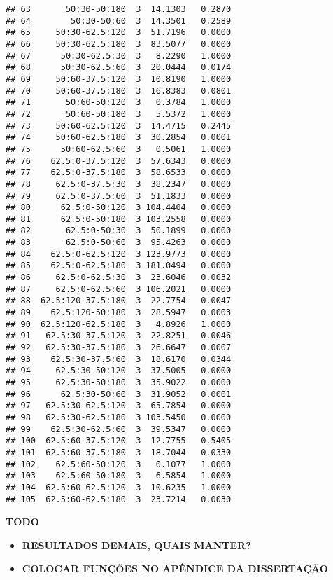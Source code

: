 \begin{knitrout}
\begin{kframe}
\begin{verbatim}
## 63       50:30-50:180  3  14.1303   0.2870
## 64        50:30-50:60  3  14.3501   0.2589
## 65     50:30-62.5:120  3  51.7196   0.0000
## 66     50:30-62.5:180  3  83.5077   0.0000
## 67      50:30-62.5:30  3   8.2290   1.0000
## 68      50:30-62.5:60  3  20.0444   0.0174
## 69     50:60-37.5:120  3  10.8190   1.0000
## 70     50:60-37.5:180  3  16.8383   0.0801
## 71       50:60-50:120  3   0.3784   1.0000
## 72       50:60-50:180  3   5.5372   1.0000
## 73     50:60-62.5:120  3  14.4715   0.2445
## 74     50:60-62.5:180  3  30.2854   0.0001
## 75      50:60-62.5:60  3   0.5061   1.0000
## 76    62.5:0-37.5:120  3  57.6343   0.0000
## 77    62.5:0-37.5:180  3  58.6533   0.0000
## 78     62.5:0-37.5:30  3  38.2347   0.0000
## 79     62.5:0-37.5:60  3  51.1833   0.0000
## 80      62.5:0-50:120  3 104.4404   0.0000
## 81      62.5:0-50:180  3 103.2558   0.0000
## 82       62.5:0-50:30  3  50.1899   0.0000
## 83       62.5:0-50:60  3  95.4263   0.0000
## 84    62.5:0-62.5:120  3 123.9773   0.0000
## 85    62.5:0-62.5:180  3 181.0494   0.0000
## 86     62.5:0-62.5:30  3  23.6046   0.0032
## 87     62.5:0-62.5:60  3 106.2021   0.0000
## 88  62.5:120-37.5:180  3  22.7754   0.0047
## 89    62.5:120-50:180  3  28.5947   0.0003
## 90  62.5:120-62.5:180  3   4.8926   1.0000
## 91   62.5:30-37.5:120  3  22.8251   0.0046
## 92   62.5:30-37.5:180  3  26.6647   0.0007
## 93    62.5:30-37.5:60  3  18.6170   0.0344
## 94     62.5:30-50:120  3  37.5005   0.0000
## 95     62.5:30-50:180  3  35.9022   0.0000
## 96      62.5:30-50:60  3  31.9052   0.0001
## 97   62.5:30-62.5:120  3  65.7854   0.0000
## 98   62.5:30-62.5:180  3 103.5450   0.0000
## 99    62.5:30-62.5:60  3  39.5347   0.0000
## 100  62.5:60-37.5:120  3  12.7755   0.5405
## 101  62.5:60-37.5:180  3  18.7044   0.0330
## 102    62.5:60-50:120  3   0.1077   1.0000
## 103    62.5:60-50:180  3   6.5854   1.0000
## 104  62.5:60-62.5:120  3  10.6235   1.0000
## 105  62.5:60-62.5:180  3  23.7214   0.0030
\end{verbatim}
\end{kframe}
\end{knitrout}



\textbf{TODO}

\begin{itemize}

  \item \textbf{RESULTADOS DEMAIS, QUAIS MANTER?}

  \item \textbf{COLOCAR FUNÇÕES NO APÊNDICE DA DISSERTAÇÃO}

\end{itemize}

